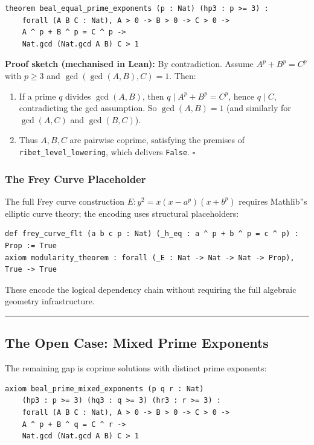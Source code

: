 \documentclass[12pt,a4paper]{article}
\begin{document}
\begin{lstlisting}[language=lean]
theorem beal_equal_prime_exponents (p : Nat) (hp3 : p >= 3) :
    forall (A B C : Nat), A > 0 -> B > 0 -> C > 0 ->
    A ^ p + B ^ p = C ^ p ->
    Nat.gcd (Nat.gcd A B) C > 1
\end{lstlisting}

\textbf{Proof sketch (mechanised in Lean):} By contradiction. Assume $A^p + B^p = C^p$ with $p \geq 3$ and $\gcd(\gcd(A,B),C) = 1$. Then:

\begin{enumerate}
    \item If a prime $q$ divides $\gcd(A,B)$, then $q \mid A^p + B^p = C^p$, hence $q \mid C$, contradicting the gcd assumption. So $\gcd(A,B) = 1$ (and similarly for $\gcd(A,C)$ and $\gcd(B,C)$).
    \item Thus $A, B, C$ are pairwise coprime, satisfying the premises of \texttt{ribet\_level\_lowering}, which delivers \texttt{False}. $\square$
\end{enumerate}

\subsubsection{The Frey Curve Placeholder}

The full Frey curve construction $E: y^2 = x(x-a^p)(x+b^p)$ requires Mathlib''s elliptic curve theory; the encoding uses structural placeholders:

\begin{lstlisting}[language=lean]
def frey_curve_flt (a b c p : Nat) (_h_eq : a ^ p + b ^ p = c ^ p) : Prop := True
axiom modularity_theorem : forall (_E : Nat -> Nat -> Nat -> Prop), True -> True
\end{lstlisting}

These encode the logical dependency chain without requiring the full algebraic geometry infrastructure.

\begin{center}
\rule{0.5\textwidth}{0.4pt}
\end{center}

\subsection{The Open Case: Mixed Prime Exponents}

The remaining gap is coprime solutions with distinct prime exponents:

\begin{lstlisting}[language=lean]
axiom beal_prime_mixed_exponents (p q r : Nat)
    (hp3 : p >= 3) (hq3 : q >= 3) (hr3 : r >= 3) :
    forall (A B C : Nat), A > 0 -> B > 0 -> C > 0 ->
    A ^ p + B ^ q = C ^ r ->
    Nat.gcd (Nat.gcd A B) C > 1
\end{lstlisting}
\end{document}
